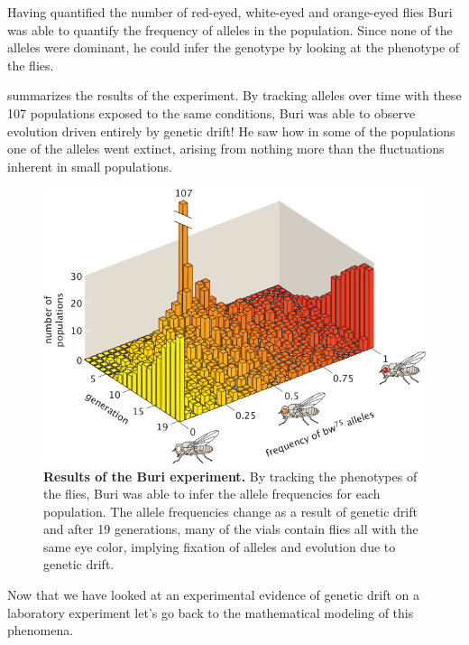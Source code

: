 Having quantified the number of red-eyed, white-eyed and orange-eyed flies Buri
was able to quantify the frequency of alleles in the population. Since none of
the alleles were dominant, he could infer the genotype  by looking at the
phenotype of the flies.

 summarizes the results of the experiment. By
tracking alleles over time with these 107 populations exposed to the same
conditions, Buri was able to observe evolution driven entirely by genetic
drift! He saw how in some of the populations one of the alleles went extinct,
arising from nothing more than the fluctuations inherent in small populations.

\begin{figure}[h!]
\centering
\includegraphics[scale=0.85]
  {../fig/drift_langevin/02_buri_experiment.png}
  \caption{\textbf{Results of the Buri experiment.} By tracking the phenotypes
  of the  flies, Buri was able to infer the allele frequencies for each
  population. The allele frequencies change as a result of genetic drift and
  after 19 generations, many of the vials contain flies all with the same eye
  color, implying fixation of alleles and evolution due to genetic drift.}
  \label{fig_02_buri_experiment}
\end{figure}

Now that we have looked at an experimental evidence of genetic drift on a
laboratory experiment let's go back to the mathematical modeling of this phenomena.